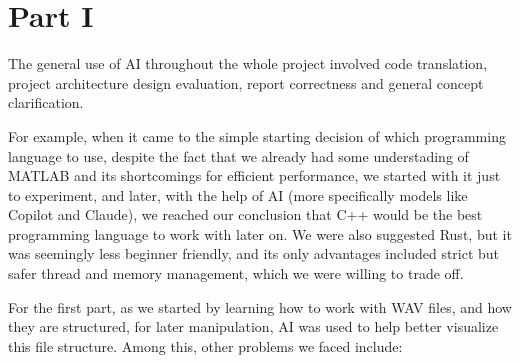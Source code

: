 \chapter{Part I}

The general use of AI throughout the whole project involved code translation, project architecture design evaluation, report correctness and general concept clarification.

For example, when it came to the simple starting decision of which programming language to use, despite the fact that we already had some understading of MATLAB and its shortcomings for efficient performance, we started with it just to experiment, and later, with the help of AI (more specifically models like Copilot and Claude), we reached our conclusion that C++ would be the best programming language to work with later on. We were also suggested Rust, but it was seemingly less beginner friendly, and its only advantages included strict but safer thread and memory management, which we were willing to trade off.

For the first part, as we started by learning how to work with WAV files, and how they are structured, for later manipulation, AI was used to help better visualize this file structure. Among this, other problems we faced include:

